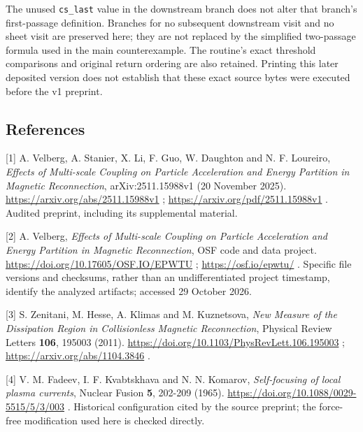 The unused \nolinkurl{cs_last} value in the downstream branch does not
alter that branch's first-passage definition. Branches for no subsequent
downstream visit and no sheet visit are preserved here; they are not
replaced by the simplified two-passage formula used in the main
counterexample. The routine's exact threshold comparisons and original
return ordering are also retained. Printing this later deposited version
does not establish that these exact source bytes were executed before
the v1 preprint.

\clearpage
\subsection{References}\label{references}

\begingroup\small
\begin{samepage}
{[}1{]} A. Velberg, A. Stanier, X. Li, F. Guo, W. Daughton and N. F.
Loureiro, \emph{Effects of Multi-scale Coupling on Particle Acceleration
and Energy Partition in Magnetic Reconnection}, arXiv:2511.15988v1 (20
November 2025). \url{https://arxiv.org/abs/2511.15988v1} ;
\url{https://arxiv.org/pdf/2511.15988v1} . Audited preprint, including
its supplemental material.
\end{samepage}

\begin{samepage}
{[}2{]} A. Velberg, \emph{Effects of Multi-scale Coupling on Particle
Acceleration and Energy Partition in Magnetic Reconnection}, OSF code
and data project. \url{https://doi.org/10.17605/OSF.IO/EPWTU} ;
\url{https://osf.io/epwtu/} . Specific file versions and checksums,
rather than an undifferentiated project timestamp, identify the analyzed
artifacts; accessed 29 October 2026.
\end{samepage}

\begin{samepage}
{[}3{]} S. Zenitani, M. Hesse, A. Klimas and M. Kuznetsova, \emph{New
Measure of the Dissipation Region in Collisionless Magnetic
Reconnection}, Physical Review Letters \textbf{106}, 195003 (2011).
\url{https://doi.org/10.1103/PhysRevLett.106.195003} ;
\url{https://arxiv.org/abs/1104.3846} .
\end{samepage}

\begin{samepage}
{[}4{]} V. M. Fadeev, I. F. Kvabtskhava and N. N. Komarov,
\emph{Self-focusing of local plasma currents}, Nuclear Fusion
\textbf{5}, 202-209 (1965).
\url{https://doi.org/10.1088/0029-5515/5/3/003} . Historical
configuration cited by the source preprint; the force-free modification
used here is checked directly.
\end{samepage}


